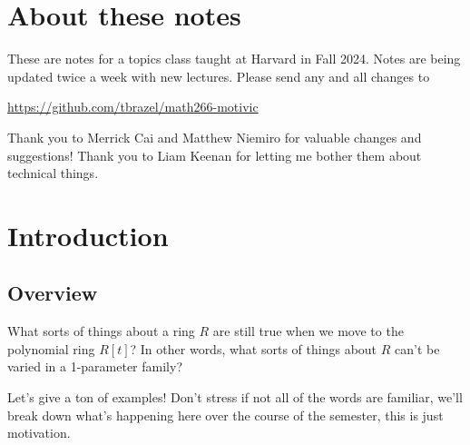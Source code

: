 \documentclass[11pt]{amsart}
\begin{document}
\begin{abstract} Notes from MATH266: Motivic homotopy theory, taught at Harvard in Fall 2024. Last compiled: \today
\end{abstract}

\maketitle

\setcounter{tocdepth}{1}
{\tiny\tableofcontents{}}

\setlength{\parskip}{0.2em}

\setcounter{section}{-1}

\section*{About these notes}

These are notes for a topics class taught at Harvard in Fall 2024. Notes are being updated twice a week with new lectures. Please send any and all changes to
\begin{center}
    \href{https://github.com/tbrazel/math266-motivic}{https://github.com/tbrazel/math266-motivic}
\end{center}
Thank you to Merrick Cai and Matthew Niemiro for valuable changes and suggestions! Thank you to Liam Keenan for letting me bother them about technical things.

\section{Introduction}

\subsection{Overview} What sorts of things about a ring $R$ are still true when we move to the polynomial ring $R[t]$? In other words, what sorts of things about $R$ can't be varied in a 1-parameter family?

Let's give a ton of examples! Don't stress if not all of the words are familiar, we'll break down what's happening here over the course of the semester, this is just motivation.
\end{document}
